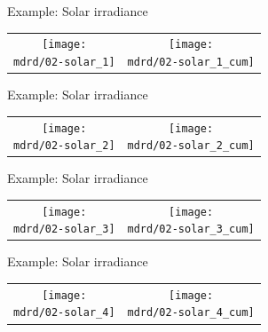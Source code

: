 \begin{frame}{Example: Solar irradiance}
\newcommand{\wmgd}{0.5\columnwidth}
\newcommand{\hmgd}{3.0cm}
\newcommand{\mdrd}{figures/02-solar}
\newcommand{\mbm}{\hspace{-0.3cm}}
{\footnotesize

}

\vspace{\baselineskip}

\begin{tabular}{cc}
\mbm \texttt{[image: \\mdrd/02-solar\_1]} & \texttt{[image: \\mdrd/02-solar\_1\_cum]}
\end{tabular}
\end{frame}

\begin{frame}{Example: Solar irradiance}
\newcommand{\wmgd}{0.5\columnwidth}
\newcommand{\hmgd}{3.0cm}
\newcommand{\mdrd}{figures/02-solar}
\newcommand{\mbm}{\hspace{-0.3cm}}
{\footnotesize

}

\vspace{\baselineskip}

\begin{tabular}{cc}
\mbm \texttt{[image: \\mdrd/02-solar\_2]} & \texttt{[image: \\mdrd/02-solar\_2\_cum]}
\end{tabular}
\end{frame}

\begin{frame}{Example: Solar irradiance}
\newcommand{\wmgd}{0.5\columnwidth}
\newcommand{\hmgd}{3.0cm}
\newcommand{\mdrd}{figures/02-solar}
\newcommand{\mbm}{\hspace{-0.3cm}}
{\footnotesize

}

\vspace{\baselineskip}

\begin{tabular}{cc}
\mbm \texttt{[image: \\mdrd/02-solar\_3]} & \texttt{[image: \\mdrd/02-solar\_3\_cum]}
\end{tabular}
\end{frame}

\begin{frame}{Example: Solar irradiance}
\newcommand{\wmgd}{0.5\columnwidth}
\newcommand{\hmgd}{3.0cm}
\newcommand{\mdrd}{figures/02-solar}
\newcommand{\mbm}{\hspace{-0.3cm}}
{\footnotesize

}

\vspace{\baselineskip}

\begin{tabular}{cc}
\mbm \texttt{[image: \\mdrd/02-solar\_4]} & \texttt{[image: \\mdrd/02-solar\_4\_cum]}
\end{tabular}
\end{frame}

